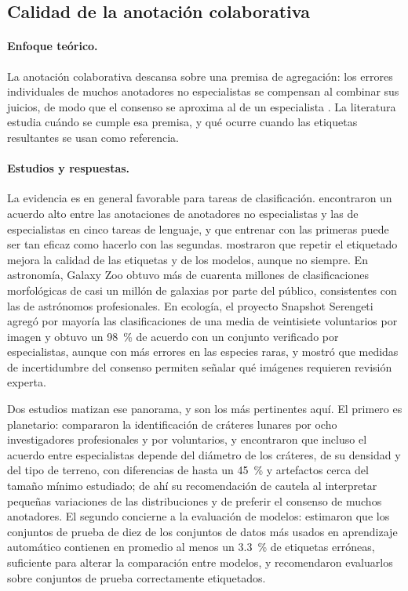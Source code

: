 \subsection{Calidad de la anotación colaborativa}
\label{sec:rev-anotacion}

\paragraph{Enfoque teórico.} La anotación colaborativa descansa sobre una premisa de
agregación: los errores individuales de muchos anotadores no especialistas se compensan al
combinar sus juicios, de modo que el consenso se aproxima al de un especialista
\citep{snow2008cheap, sheng2008label}. La literatura
estudia cuándo se cumple esa premisa, y qué ocurre cuando las etiquetas resultantes se usan
como referencia.

\paragraph{Estudios y respuestas.} La evidencia es en general favorable para tareas de
clasificación. \citet{snow2008cheap} encontraron un acuerdo alto entre las anotaciones de
anotadores no especialistas y las de especialistas en cinco tareas de lenguaje, y que
entrenar con las primeras puede ser tan eficaz como hacerlo con las segundas.
\citet{sheng2008label} mostraron que repetir el etiquetado mejora la calidad de las etiquetas
y de los modelos, aunque no siempre. En astronomía, Galaxy Zoo \citep{lintott2008galaxyzoo}
obtuvo más de cuarenta millones de clasificaciones morfológicas de casi un millón de galaxias
por parte del público, consistentes con las de astrónomos profesionales. En ecología, el
proyecto Snapshot Serengeti \citep{swanson2016citizen} agregó por mayoría las clasificaciones
de una media de veintisiete voluntarios por imagen y obtuvo un \SI{98}{\percent} de acuerdo
con un conjunto verificado por especialistas, aunque con más errores en las especies raras, y
mostró que medidas de incertidumbre del consenso permiten señalar qué imágenes requieren
revisión experta.

Dos estudios matizan ese panorama, y son los más pertinentes aquí. El primero es planetario:
\citet{robbins2014craters} compararon la identificación de cráteres lunares por ocho
investigadores profesionales y por voluntarios, y encontraron que incluso el acuerdo entre
especialistas depende del diámetro de los cráteres, de su densidad y del tipo de terreno, con
diferencias de hasta un \SI{45}{\percent} y artefactos cerca del tamaño mínimo estudiado; de
ahí su recomendación de cautela al interpretar pequeñas variaciones de las distribuciones y
de preferir el consenso de muchos anotadores. El segundo concierne a la evaluación de modelos:
\citet{northcutt2021labelerrors} estimaron que los conjuntos de prueba de diez de los conjuntos
de datos más usados en aprendizaje automático contienen en promedio al menos un
\SI{3.3}{\percent} de etiquetas erróneas, suficiente para alterar la comparación entre
modelos, y recomendaron evaluarlos sobre conjuntos de prueba correctamente etiquetados.

